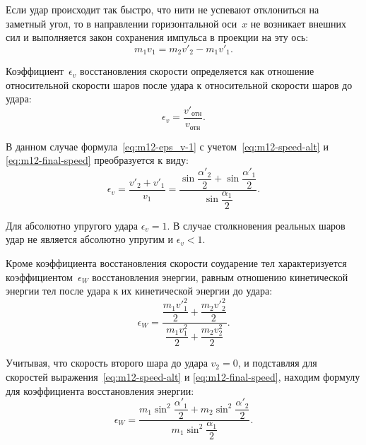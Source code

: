\documentclass[a4paper, 12pt]{extarticle}
\newcommand{\eps}{\epsilon}
\begin{document}
Если удар происходит так быстро, что нити не успевают отклониться на заметный угол, то в направлении горизонтальной оси~$x$ не возникает внешних сил и выполняется закон сохранения импульса в проекции на эту ось: %
\begin{equation}
\label{eq:m12-momentum}
m_1 v_1 = m_2 v'_2 - m_1 v'_1.
\end{equation}

Коэффициент~$\eps_v$ восстановления скорости определяется как отношение относительной скорости шаров после удара к относительной скорости шаров до удара:
\begin{equation}
\label{eq:m12-eps_v-1}
\eps_v = \frac{v'_\text{отн}}{v_\text{отн}}.
\end{equation}

В данном случае формула~\eqref{eq:m12-eps_v-1} с учетом~\eqref{eq:m12-speed-alt} и \eqref{eq:m12-final-speed} преобразуется к виду: %
\begin{equation}
\label{eq:m12-eps_v-2}
\eps_v = \frac{v'_2 + v'_1}{v_1} = \frac{\sin \dfrac{\alpha'_2}{2} + \sin \dfrac{\alpha'_1}{2}}{\sin \dfrac{\alpha_1}{2}}.
\end{equation}

Для абсолютно упругого удара $\eps_v = 1$. В случае столкновения реальных шаров удар не является абсолютно упругим и $\eps_v < 1$.

Кроме коэффициента восстановления скорости соударение тел характеризуется коэффициентом~$\eps_W$ восстановления энергии, равным отношению кинетической энергии тел после удара к их кинетической энергии до удара:
\begin{equation}
\label{eq:m12-eps_W-1}
\eps_W = \frac{\dfrac{m_1 v'^2_1}{2} + \dfrac{m_2 v'^2_2}{2}}{\dfrac{m_1 v^2_1}{2} + \dfrac{m_2 v^2_2}{2}}.
\end{equation} %

Учитывая, что скорость второго шара до удара $v_2 = 0$, и подставляя для скоростей выражения~\eqref{eq:m12-speed-alt} и \eqref{eq:m12-final-speed}, находим формулу для коэффициента восстановления энергии: %
\begin{equation}
\label{eq:m12-eps_W-2}
\eps_W = \frac{m_1 \sin^2 \dfrac{\alpha'_1}{2} + m_2 \sin^2 \dfrac{\alpha'_2}{2}}{m_1 \sin^2 \dfrac{\alpha_1}{2}}.
\end{equation}
\end{document}
